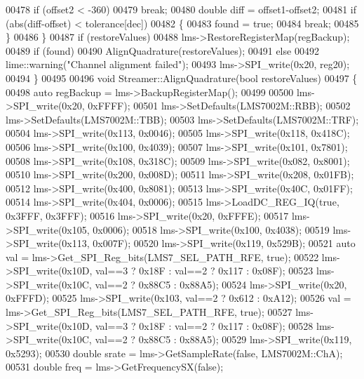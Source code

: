 \begin{DoxyCode}
00478         \textcolor{keywordflow}{if} (offset2 < -360)
00479             \textcolor{keywordflow}{break};
00480         \textcolor{keywordtype}{double} diff = offset1-offset2;
00481         \textcolor{keywordflow}{if} (abs(diff-offset) < tolerance[dec])
00482         \{
00483             found = \textcolor{keyword}{true};
00484             \textcolor{keywordflow}{break};
00485         \}
00486     \}
00487     \textcolor{keywordflow}{if} (restoreValues)
00488         lms->RestoreRegisterMap(regBackup);
00489     \textcolor{keywordflow}{if} (found)
00490         AlignQuadrature(restoreValues);
00491     \textcolor{keywordflow}{else}
00492         lime::warning(\textcolor{stringliteral}{"Channel alignment failed"});
00493     lms->SPI_write(0x20, reg20);
00494 \}
00495 
00496 \textcolor{keywordtype}{void} Streamer::AlignQuadrature(\textcolor{keywordtype}{bool} restoreValues)
00497 \{
00498     \textcolor{keyword}{auto} regBackup = lms->BackupRegisterMap();
00499 
00500     lms->SPI_write(0x20, 0xFFFF);
00501     lms->SetDefaults(LMS7002M::RBB);
00502     lms->SetDefaults(LMS7002M::TBB);
00503     lms->SetDefaults(LMS7002M::TRF);
00504     lms->SPI_write(0x113, 0x0046);
00505     lms->SPI_write(0x118, 0x418C);
00506     lms->SPI_write(0x100, 0x4039);
00507     lms->SPI_write(0x101, 0x7801);
00508     lms->SPI_write(0x108, 0x318C);
00509     lms->SPI_write(0x082, 0x8001);
00510     lms->SPI_write(0x200, 0x008D);
00511     lms->SPI_write(0x208, 0x01FB);
00512     lms->SPI_write(0x400, 0x8081);
00513     lms->SPI_write(0x40C, 0x01FF);
00514     lms->SPI_write(0x404, 0x0006);
00515     lms->LoadDC_REG_IQ(\textcolor{keyword}{true}, 0x3FFF, 0x3FFF);
00516     lms->SPI_write(0x20, 0xFFFE);
00517     lms->SPI_write(0x105, 0x0006);
00518     lms->SPI_write(0x100, 0x4038);
00519     lms->SPI_write(0x113, 0x007F);
00520     lms->SPI_write(0x119, 0x529B);
00521     \textcolor{keyword}{auto} val = lms->Get_SPI_Reg_bits(LMS7_SEL_PATH_RFE, \textcolor{keyword}{true});
00522     lms->SPI_write(0x10D, val==3 ? 0x18F : val==2 ? 0x117 : 0x08F);
00523     lms->SPI_write(0x10C, val==2 ? 0x88C5 : 0x88A5);
00524     lms->SPI_write(0x20, 0xFFFD);
00525     lms->SPI_write(0x103, val==2 ? 0x612 : 0xA12);
00526     val = lms->Get_SPI_Reg_bits(LMS7_SEL_PATH_RFE, \textcolor{keyword}{true});
00527     lms->SPI_write(0x10D, val==3 ? 0x18F : val==2 ? 0x117 : 0x08F);
00528     lms->SPI_write(0x10C, val==2 ? 0x88C5 : 0x88A5);
00529     lms->SPI_write(0x119, 0x5293);
00530     \textcolor{keywordtype}{double} srate = lms->GetSampleRate(\textcolor{keyword}{false}, LMS7002M::ChA);
00531     \textcolor{keywordtype}{double} freq = lms->GetFrequencySX(\textcolor{keyword}{false});

\end{DoxyCode}
